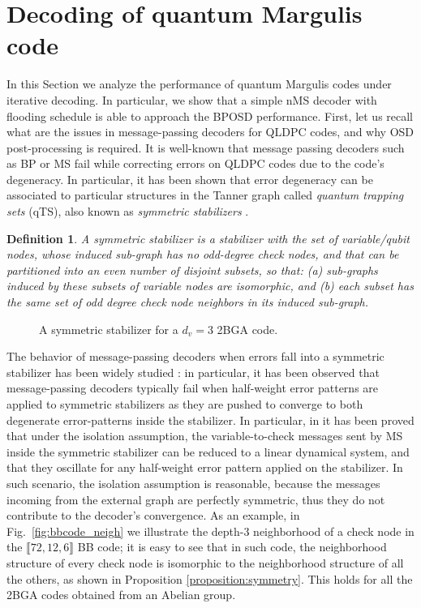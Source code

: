 \documentclass[a4paper,twocolumn,11pt,accepted=2026-05-03]{quantumarticle}
\newtheorem{definition}{Definition}
\begin{document}
\section{Decoding of quantum Margulis code}
\label{sec:decoding}
In this Section we analyze the performance of quantum Margulis codes under iterative decoding. In particular, we show that a simple nMS decoder with flooding schedule is able to approach the BPOSD performance. 
First, let us recall what are the issues in message-passing decoders for QLDPC codes, and why OSD post-processing is required. It is well-known that message passing decoders such as BP or MS fail while correcting errors on QLDPC codes due to the code's degeneracy. In particular, it has been shown that error degeneracy can be associated to particular structures in the Tanner graph called \textit{quantum trapping sets} (qTS), also known as \textit{symmetric stabilizers} \cite{raveendran_trapping_2021}.
\begin{definition}
    A symmetric stabilizer is a stabilizer with the set of variable/qubit nodes, whose induced sub-graph has no odd-degree check nodes, and that can be partitioned into an even number of disjoint subsets, so that: (a) sub-graphs induced by these subsets of variable nodes are isomorphic, and (b) each subset has the same set of odd degree check node neighbors in its induced sub-graph.
\end{definition}
\begin{figure}
    \centering
    
    \caption{A symmetric stabilizer for a $d_v=3$ 2BGA code.}
\end{figure}
The behavior of message-passing decoders when errors fall into a symmetric stabilizer has been widely studied \cite{chytas_enhanced_2024,chytas2024collectivebitflippingbaseddecoding,chytas2025enhancedminsumdecodingquantum}: in particular, it has been observed that message-passing decoders typically fail when half-weight error patterns are applied to symmetric stabilizers as they are pushed to converge to both degenerate error-patterns inside the stabilizer.
In particular, in \cite{chytas2025enhancedminsumdecodingquantum} it has been proved that under the isolation assumption, the variable-to-check messages sent by MS inside the symmetric stabilizer can be reduced to a linear dynamical system, and that they oscillate for any half-weight error pattern applied on the stabilizer. In such scenario, the isolation assumption is reasonable, because the messages incoming from the external graph are perfectly symmetric, thus they do not contribute to the decoder's convergence.
As an example, in Fig.~\ref{fig:bbcode_neigh} we illustrate the depth-3 neighborhood of a check node in the $\llbracket 72,12,6 \rrbracket$ BB code; it is easy to see that in such code, the neighborhood structure of every check node is isomorphic to the neighborhood structure of all the others, as shown in Proposition \ref{proposition:symmetry}. This holds for all the 2BGA codes obtained from an Abelian group.
\end{document}
